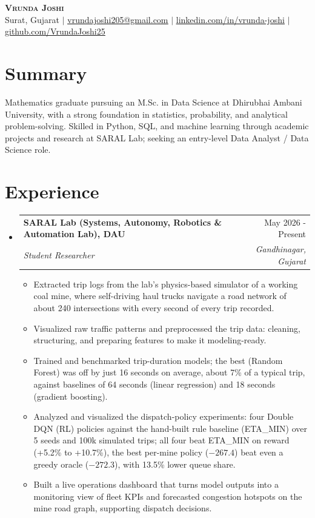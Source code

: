 \documentclass[letterpaper,11pt]{article}
\makeatletter
\newcommand{\resumeItem}[1]{
  \item\small{
    {#1 \vspace{-2pt}}
  }
}
\newcommand{\resumeSubheading}[4]{
  \vspace{-2pt}\item
    \begin{tabularx}{\textwidth}[t]{@{}Xr@{}}
      \textbf{#1} & #2 \\
      \textit{\small#3} & \textit{\small #4} \\
    \end{tabularx}\vspace{-7pt}
}
\newcommand{\resumeSubHeadingListStart}{\begin{itemize}[leftmargin=0in, label={}]}
\newcommand{\resumeSubHeadingListEnd}{\end{itemize}}
\newcommand{\resumeItemListStart}{\begin{itemize}[leftmargin=0.15in, label=\textbullet]}
\newcommand{\resumeItemListEnd}{\end{itemize}\vspace{-2pt}}
\makeatother
\begin{document}
\begin{center}
    \textbf{\Huge \scshape Vrunda Joshi} \\ \vspace{1pt}
    \small Surat, Gujarat $|$
    \href{mailto:vrundajoshi205@gmail.com}{\underline{vrundajoshi205@gmail.com}} $|$
    \href{https://www.linkedin.com/in/vrunda-joshi-a982b037b}{\underline{linkedin.com/in/vrunda-joshi}} $|$
    \href{https://github.com/VrundaJoshi25}{\underline{github.com/VrundaJoshi25}}
\end{center}

\section{Summary}
\small{Mathematics graduate pursuing an M.Sc. in Data Science at Dhirubhai Ambani University, with a strong foundation in statistics, probability, and analytical problem-solving. Skilled in Python, SQL, and machine learning through academic projects and research at SARAL Lab; seeking an entry-level Data Analyst / Data Science role.}

\section{Experience}
  \resumeSubHeadingListStart
    \resumeSubheading
      {SARAL Lab (Systems, Autonomy, Robotics \& Automation Lab), DAU}{May 2026 - Present}
      {Student Researcher}{Gandhinagar, Gujarat}
      \resumeItemListStart
        \resumeItem{Extracted trip logs from the lab's physics-based simulator of a working coal mine, where self-driving haul trucks navigate a road network of about 240 intersections with every second of every trip recorded.}
        \resumeItem{Visualized raw traffic patterns and preprocessed the trip data: cleaning, structuring, and preparing features to make it modeling-ready.}
        \resumeItem{Trained and benchmarked trip-duration models; the best (Random Forest) was off by just 16 seconds on average, about 7\% of a typical trip, against baselines of 64 seconds (linear regression) and 18 seconds (gradient boosting).}
        \resumeItem{Analyzed and visualized the dispatch-policy experiments: four Double DQN (RL) policies against the hand-built rule baseline (ETA\_MIN) over 5 seeds and 100k simulated trips; all four beat ETA\_MIN on reward (+5.2\% to +10.7\%), the best per-mine policy ($-267.4$) beat even a greedy oracle ($-272.3$), with 13.5\% lower queue share.}
        \resumeItem{Built a live operations dashboard that turns model outputs into a monitoring view of fleet KPIs and forecasted congestion hotspots on the mine road graph, supporting dispatch decisions.}
      \resumeItemListEnd
  \resumeSubHeadingListEnd
\end{document}
